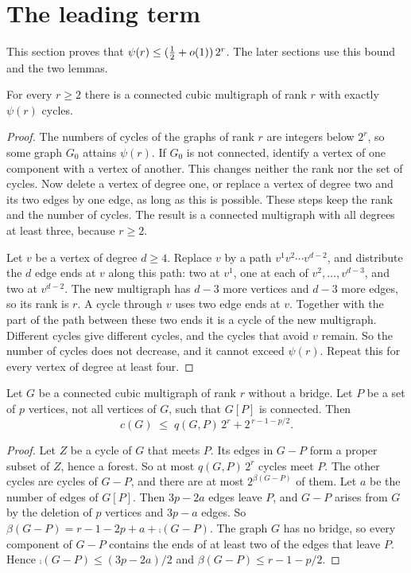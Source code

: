 \section{The leading term}\label{sec:leading}

This section proves that $\psi(r)\le(\tfrac12+o(1))\,2^{r}$. The later sections use this bound and
the two lemmas.

\begin{lemma}\label{lem:cubic}
For every $r\ge2$ there is a connected cubic multigraph of rank $r$ with exactly $\psi(r)$ cycles.
\end{lemma}

\begin{proof}
The numbers of cycles of the graphs of rank $r$ are integers below $2^{r}$, so some graph $G_0$
attains $\psi(r)$. If $G_0$ is not connected, identify a vertex of one component with a vertex of
another. This changes neither the rank nor the set of cycles. Now delete a vertex of degree one, or
replace a vertex of degree two and its two edges by one edge, as long as this is possible. These
steps keep the rank and the number of cycles. The result is a connected multigraph with all
degrees at least three, because $r\ge2$.

Let $v$ be a vertex of degree $d\ge4$. Replace $v$ by a path $v^{1}v^{2}\cdots v^{d-2}$, and
distribute the $d$ edge ends at $v$ along this path: two at $v^{1}$, one at each of
$v^{2},\dots,v^{d-3}$, and two at $v^{d-2}$. The new multigraph has $d-3$ more vertices and $d-3$
more edges, so its rank is $r$. A cycle through $v$ uses two edge ends at $v$. Together with the
part of the path between these two ends it is a cycle of the new multigraph. Different cycles give
different cycles, and the cycles that avoid $v$ remain. So the number of cycles does not decrease,
and it cannot exceed $\psi(r)$. Repeat this for every vertex of degree at least four.
\end{proof}

\begin{lemma}\label{lem:marked}
Let $G$ be a connected cubic multigraph of rank $r$ without a bridge. Let $P$ be a set of $p$
vertices, not all vertices of $G$, such that $G[P]$ is connected. Then
\[
  c(G)\;\le\;q(G,P)\,2^{r}+2^{\,r-1-p/2}.
\]
\end{lemma}

\begin{proof}
Let $Z$ be a cycle of $G$ that meets $P$. Its edges in $G-P$ form a proper subset of $Z$, hence a
forest. So at most $q(G,P)\,2^{r}$ cycles meet $P$. The other cycles are cycles of $G-P$, and
there are at most $2^{\beta(G-P)}$ of them. Let $a$ be the number of edges of $G[P]$. Then $3p-2a$
edges leave $P$, and $G-P$ arises from $G$ by the deletion of $p$ vertices and $3p-a$ edges. So
$\beta(G-P)=r-1-2p+a+\comp(G-P)$. The graph $G$ has no bridge, so every component of $G-P$
contains the ends of at least two of the edges that leave $P$. Hence $\comp(G-P)\le(3p-2a)/2$ and
$\beta(G-P)\le r-1-p/2$.
\end{proof}

